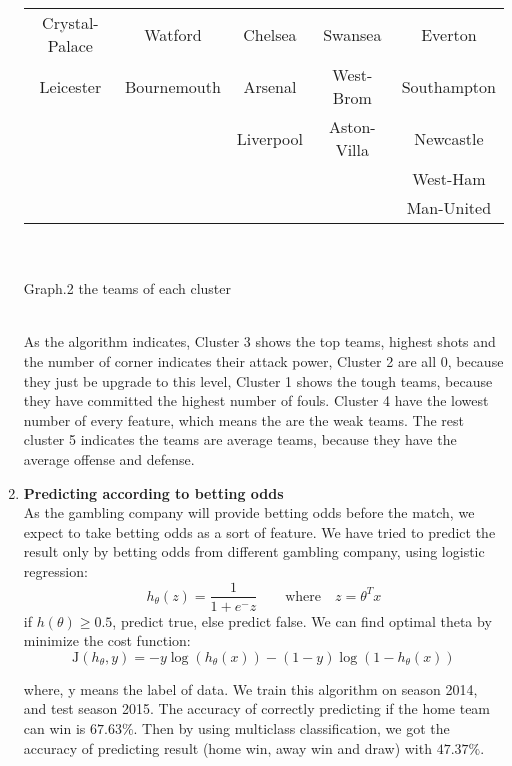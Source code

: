 \documentclass[a4paper,11pt,fleqn]{article}
\begin{document}
\begin{enumerate}
\begin{center}
\begin{tabular}{|ccccc|}
       Crystal-Palace  & Watford &Chelsea &Swansea& Everton\\
       Leicester & Bournemouth &Arsenal& West-Brom &Southampton\\
         &  &Liverpool &Aston-Villa&Newcastle\\
        &  &&&West-Ham\\
        &  &&&Man-United\\
      \hline
    \end{tabular}\\
    \ \\
    {\small Graph.2 the teams of each cluster}
\end{center}
\   \\
As the algorithm indicates, Cluster 3 shows the top teams, highest shots and the number of corner indicates their attack power, Cluster 2 are all 0, because they just be upgrade to this level, Cluster 1 shows the tough teams, because they have committed the highest number of fouls. Cluster 4 have the lowest number of every feature, which means the are the weak teams. The rest cluster 5 indicates the teams are average teams, because they have the average offense and defense.  \\

\item \textbf{Predicting according to betting odds}\\
As the gambling company will provide betting odds before the match, we expect to take betting odds as a sort of feature. We have tried to predict the result only by betting odds from different gambling company, using logistic regression:
\begin{equation}
h_\theta(z)=\frac{1}{1+e^-z} \qquad \textrm{where} \quad z=\theta^Tx
\end{equation}
if $h(\theta) \geq 0.5$, predict true, else predict false. We can find optimal theta by minimize the cost function:
\begin{equation}
\textrm{J}(h_\theta, y)=-y\log(h_\theta(x))-(1-y)\log(1-h_\theta(x))
\end{equation}

where, y means the label of data. We train this algorithm on season 2014, and test season 2015. The accuracy of correctly predicting if the home team can win is $67.63\%$. Then by using multiclass classification, we got the accuracy of predicting result (home win, away win and draw) with $47.37\%$.

\end{enumerate}
\end{document}
